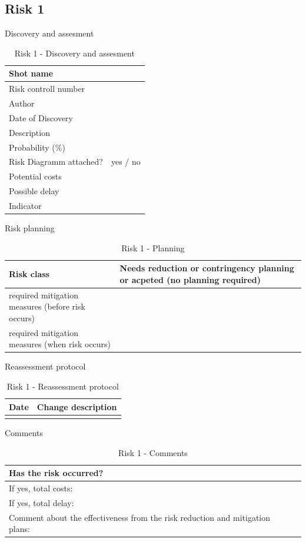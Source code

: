 \documentclass[a4paper, 12pt,twoside]{article}
\begin{document}
\subsection{Risk 1}
Discovery and assesment
\begin{table}[t!h]
	\centering
	\begin{tabular}{|p{5cm}|p{10cm}|}
		\hline
		Shot name & \\\hline
		Risk controll number & \\\hline
		Author & \\\hline
		Date of Discovery & \\\hline
		Description & \\\hline
		Probability (\%) & \\\hline
		Risk Diagramm attached? & yes / no \\\hline
		Potential costs & \\\hline
		Possible delay & \\\hline
		Indicator & \\\hline
	\end{tabular}
	\caption{Risk 1 - Discovery and assesment}
	\label{tab:risk:1:discovery}
\end{table}
Risk planning
\begin{table}[t!h]
	\centering
	\begin{tabular}{|p{5cm}|p{10cm}|}
		\hline
		Risk class & Needs reduction or contringency planning or acpeted (no planning required) \\\hline
		required mitigation measures (before risk occurs) & \\\hline
		required mitigation measures (when risk occurs) & \\\hline
	\end{tabular}
	\caption{Risk 1 - Planning}
	\label{tab:risk:1:planning}
\end{table}
Reassessment protocol
\begin{table}[t!h]
	\centering
	\begin{tabular}{|p{5cm}|p{10cm}|}
		\hline
		Date & Change description \\\hline
		& \\\hline
	\end{tabular}
	\caption{Risk 1 - Reassessment protocol}
	\label{tab:risk:1:reassesment}
\end{table}
Comments
\begin{table}[t!h]
	\centering
	\begin{tabular}{|p{5cm}|p{10cm}|}
		\hline
		Has the risk occurred? & \\\hline
		If yes, total costs:& \\\hline
		If yes, total delay: & \\\hline
		Comment about the effectiveness from the risk reduction and mitigation plans: & \\\hline
	\end{tabular}
	\caption{Risk 1 - Comments}
	\label{tab:risk:1:comments}
\end{table}
\end{document}
